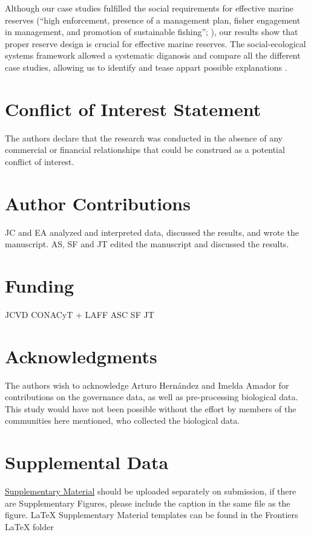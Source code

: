 \documentclass{frontiersSCNS}
\theoremstyle{definition}
\theoremstyle{definition}
\theoremstyle{definition}
\theoremstyle{remark}
\begin{document}
Although our case studies fulfilled the social requirements for
effective marine reserves (``high enforcement, presence of a management
plan, fisher engagement in management, and promotion of sustainable
fishing''; \citet{difranco_2016-Xw}), our results show that proper
reserve design is crucial for effective marine reserves. The
social-ecological systems framework allowed a systematic diganosis and
compare all the different case studies, allowing us to identify and
tease appart possible explanations \citep{basurto_2013-oq}.

\section*{Conflict of Interest Statement}

The authors declare that the research was conducted in the absence of
any commercial or financial relationships that could be construed as a
potential conflict of interest.

\section*{Author Contributions}

JC and EA analyzed and interpreted data, discussed the results, and
wrote the manuscript. AS, SF and JT edited the manuscript and discussed
the results.

\section*{Funding}

JCVD CONACyT + LAFF ASC SF JT

\section*{Acknowledgments}

The authors wish to acknowledge Arturo Hernández and Imelda Amador for
contributions on the governance data, as well as pre-processing
biological data. This study would have not been possible without the
effort by members of the communities here mentioned, who collected the
biological data.

\section*{Supplemental Data}

\href{http://home.frontiersin.org/about/author-guidelines#SupplementaryMaterial}{Supplementary Material}
should be uploaded separately on submission, if there are Supplementary
Figures, please include the caption in the same file as the figure.
LaTeX Supplementary Material templates can be found in the Frontiers
LaTeX folder
\end{document}
